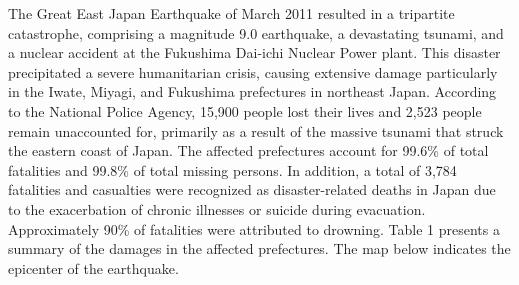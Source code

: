 \documentclass[a4paper,12pt]{article}
\begin{document}
The Great East Japan Earthquake of March 2011 resulted in a tripartite catastrophe, comprising a magnitude 9.0 earthquake, a devastating tsunami, and a nuclear accident at the Fukushima Dai-ichi Nuclear Power plant. This disaster precipitated a severe humanitarian crisis, causing extensive damage particularly in the Iwate, Miyagi, and Fukushima prefectures in northeast Japan. According to the National Police Agency, 15,900 people lost their lives and 2,523 people remain unaccounted for, primarily as a result of the massive tsunami that struck the eastern coast of Japan. The affected prefectures account for 99.6\% of total fatalities and 99.8\% of total missing persons. In addition, a total of 3,784 fatalities and casualties were recognized as disaster-related deaths in Japan due to the exacerbation of chronic illnesses or suicide during evacuation. Approximately 90\% of fatalities were attributed to drowning. Table 1 presents a summary of the damages in the affected prefectures. The map below indicates the epicenter of the earthquake.
\end{document}
